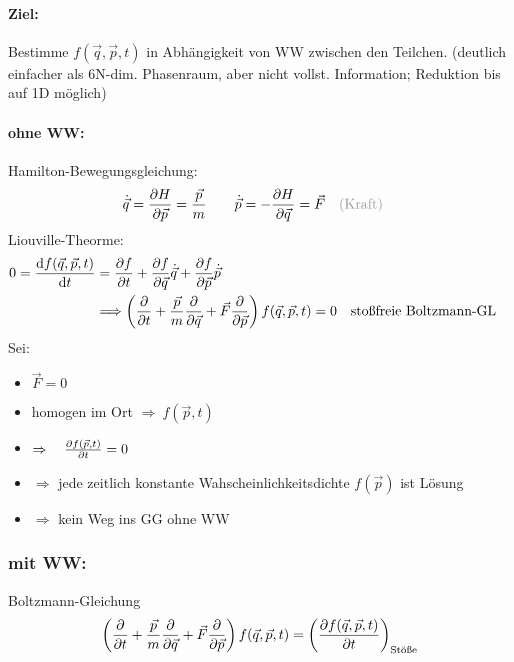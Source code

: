 \paragraph{Ziel:} Bestimme $f(\Vec{q},\Vec{p},t)$ in Abhängigkeit von WW zwischen den Teilchen. \color{black!40} (deutlich einfacher als 6N-dim. Phasenraum, aber nicht vollst. Information; Reduktion bis auf 1D möglich) \color{black}

\paragraph{ohne WW:}
Hamilton-Bewegungsgleichung:
\begin{equation}
    \dot{\Vec{q}} = \pdv{H}{\Vec{p}} = \frac{\Vec{p}}{m} \qquad \dot{\Vec{p}} = - \pdv{H}{\Vec{q}} = \Vec{F} \qq{\color{black!40}(Kraft)\color{black}}
\end{equation}
Liouville-Theorme:
\begin{align}
    0 = \dv{f(\Vec{q},\Vec{p},t)}{t} &= \pdv{f}{t} + \pdv{f}{\Vec{q}} \Dot{\Vec{q}} + \pdv{f}{\Vec{p}} \Dot{\Vec{p}} \\
    &\Longrightarrow \left( \pdv{}{t} + \frac{\Vec{p}}{m} \pdv{}{\Vec{q}} + \Vec{F} \pdv{}{\Vec{p}} \right) f(\Vec{q},\Vec{p},t) = 0 \qq{stoßfreie Boltzmann-GL}
\end{align}
Sei:
\begin{itemize}
    \item $\Vec{F}=0$
    \item homogen im Ort $\Rightarrow \ f(\Vec{p},t)$
    \item[] $\Rightarrow \quad \pdv{f(\Vec{p},t)}{t}=0$
    \item[] $\Rightarrow$ jede zeitlich konstante Wahscheinlichkeitsdichte $f(\Vec{p})$ ist Lösung
    \item[] $\Rightarrow$ kein Weg ins GG ohne WW
\end{itemize}

\subsubsection*{mit WW:}
\begin{definition}{Boltzmann-Gleichung}
    \begin{equation}
    \left( \pdv{}{t} + \frac{\Vec{p}}{m} \pdv{}{\Vec{q}} + \Vec{F} \pdv{}{\Vec{p}} \right) f(\Vec{q},\Vec{p},t) = \left(\pdv{f(\Vec{q},\Vec{p},t)}{t}\right)_{\text{Stöße}}
    \end{equation}
\end{definition}

